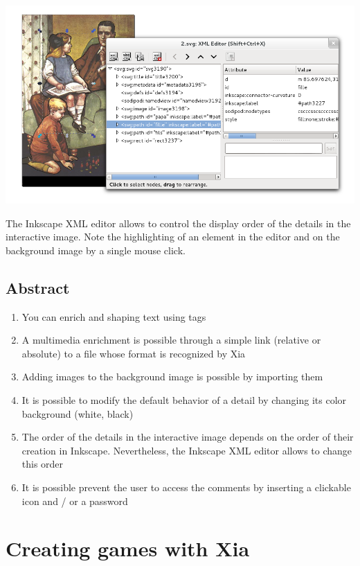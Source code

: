 \begin{center}
 \includegraphics[width=\textwidth]{images/ordre_couches}\\
\end{center}
 
 The Inkscape XML editor allows to control the display order of the details 
in the interactive image. Note the highlighting of an element  
in the editor and on the background image by a single mouse click.

\subsection{Abstract}

\begin{enumerate}
 \item You can enrich and shaping text using tags
 \item A multimedia enrichment is possible through a simple link (relative
or absolute) to a file whose format is recognized by Xia
 \item Adding images to the background image is possible by importing them
 \item It is possible to modify the default behavior of a detail by changing its color 
background (white, black)
 \item The order of the details in the interactive image depends on the order
of their creation in Inkscape. Nevertheless, the Inkscape XML editor allows to change this order
\item It is possible prevent the user to access the comments by inserting a clickable icon and / or a password
\end{enumerate}

\newpage

\section{Creating games with Xia}\label{games_IA}

